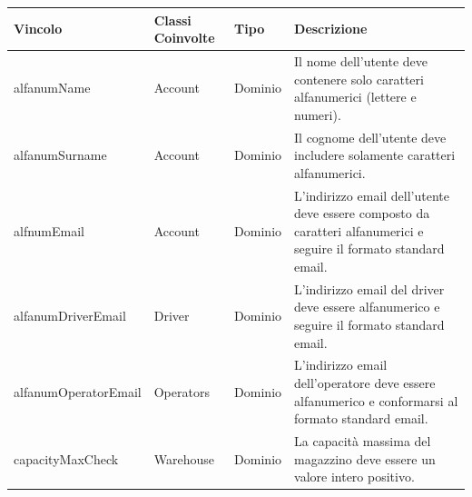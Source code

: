 \begin{tabularx}{\textwidth}{YYYY}
  \toprule
  \textbf{Vincolo} & \textbf{Classi Coinvolte} & \textbf{Tipo} & \textbf{Descrizione} \\
  \midrule
  alfanumName & Account & Dominio &
  \begin{minipage}[c]{\linewidth}
    \vspace{0.5cm}
    Il nome dell'utente deve contenere solo caratteri alfanumerici (lettere e numeri). \newline
  \end{minipage} \\
  alfanumSurname & Account & Dominio &
  \begin{minipage}[c]{\linewidth}
    \vspace{0.5cm}
    Il cognome dell'utente deve includere solamente caratteri alfanumerici. \newline
  \end{minipage} \\
  alfnumEmail & Account & Dominio &
  \begin{minipage}[c]{\linewidth}
    \vspace{0.5cm}
    L'indirizzo email dell'utente deve essere composto da caratteri alfanumerici e seguire il formato standard email. \newline
  \end{minipage} \\
  alfanumDriverEmail & Driver & Dominio &
  \begin{minipage}[c]{\linewidth}
    \vspace{0.5cm}
    L'indirizzo email del driver deve essere alfanumerico e seguire il formato standard email. \newline
  \end{minipage} \\
  alfanumOperatorEmail & Operators & Dominio &
  \begin{minipage}[c]{\linewidth}
    \vspace{0.5cm}
    L'indirizzo email dell'operatore deve essere alfanumerico e conformarsi al formato standard email. \newline
  \end{minipage} \\
  capacityMaxCheck & Warehouse & Dominio &
  \begin{minipage}[c]{\linewidth}
    \vspace{0.5cm}
    La capacità massima del magazzino deve essere un valore intero positivo. \newline

\end{minipage}
\end{tabularx}
